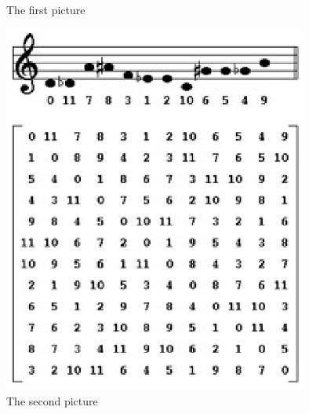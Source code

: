 \begin{figure}
\begin{center}
\end{center}

\caption{The first picture\label{m42}}
\end{figure}


\begin{figure} %
  \centering
  \includegraphics[width=10cm]{figures/Matrix}
  \caption{The second picture}
  \label{fig:xfig1}
\end{figure}


